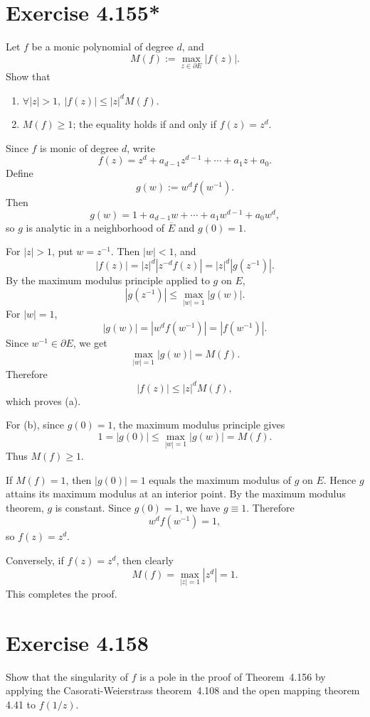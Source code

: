 \documentclass{article}
\begin{document}
\section{Exercise 4.155*}

Let $f$ be a monic polynomial of degree $d$, and
\[
  M(f):=\max_{z\in\partial E}|f(z)|.
\]
Show that

\begin{enumerate}
  \item[(a)] $\forall |z|>1,\ |f(z)|\le |z|^dM(f)$.
  \item[(b)] $M(f)\ge1$; the equality holds if and only if $f(z)=z^d$.
\end{enumerate}

\begin{solution}
  Since $f$ is monic of degree $d$, write
  \[
    f(z)=z^d+a_{d-1}z^{d-1}+\cdots+a_1z+a_0.
  \]
  Define
  \[
    g(w):=w^d f(w^{-1}).
  \]
  Then
  \[
    g(w)=1+a_{d-1}w+\cdots+a_1w^{d-1}+a_0w^d,
  \]
  so $g$ is analytic in a neighborhood of $\overline E$ and $g(0)=1$.

  For $|z|>1$, put $w=z^{-1}$. Then $|w|<1$, and
  \[
    |f(z)|=|z|^d |z^{-d}f(z)|
    =|z|^d |g(z^{-1})|.
  \]
  By the maximum modulus principle applied to $g$ on $E$,
  \[
    |g(z^{-1})|
    \le \max_{|w|=1}|g(w)|.
  \]
  For $|w|=1$,
  \[
    |g(w)|=|w^d f(w^{-1})|=|f(w^{-1})|.
  \]
  Since $w^{-1}\in\partial E$, we get
  \[
    \max_{|w|=1}|g(w)|=M(f).
  \]
  Therefore
  \[
    |f(z)|\le |z|^dM(f),
  \]
  which proves (a).

  For (b), since $g(0)=1$, the maximum modulus principle gives
  \[
    1=|g(0)|\le \max_{|w|=1}|g(w)|=M(f).
  \]
  Thus $M(f)\ge1$.

  If $M(f)=1$, then $|g(0)|=1$ equals the maximum modulus of $g$ on $E$.
  Hence $g$ attains its maximum modulus at an interior point. By the maximum
  modulus theorem, $g$ is constant. Since $g(0)=1$, we have $g\equiv1$.
  Therefore
  \[
    w^d f(w^{-1})=1,
  \]
  so $f(z)=z^d$.

  Conversely, if $f(z)=z^d$, then clearly
  \[
    M(f)=\max_{|z|=1}|z^d|=1.
  \]
  This completes the proof.
\end{solution}

\section{Exercise 4.158}

Show that the singularity of $f$ is a pole in the proof of Theorem~4.156 by
applying the Casorati-Weierstrass theorem~4.108 and the open mapping theorem
4.41 to $f(1/z)$.
\end{document}
